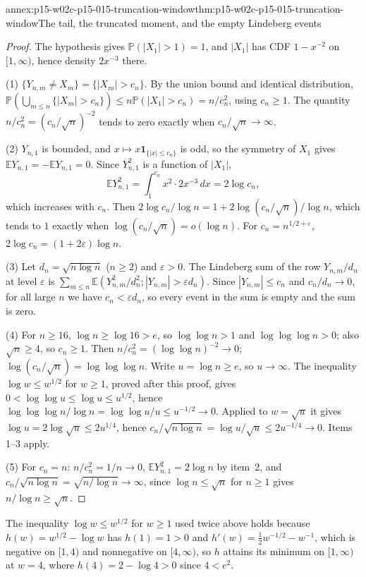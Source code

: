 \begin{annexitem}{annex:p15-w02c-p15-015-truncation-window}{thm:p15-w02c-p15-015-truncation-window}{The tail, the truncated moment, and the empty Lindeberg events}
\begin{proof}
The hypothesis gives \(\mathbb P(|X_1|>1)=1\), and \(|X_1|\) has CDF
\(1-x^{-2}\) on \([1,\infty)\), hence density \(2x^{-3}\) there.

(1) \(\{Y_{n,m}\ne X_m\}=\{|X_m|>c_n\}\). By the union bound and
identical distribution,
\(\mathbb P(\bigcup_{m\leq n}\{|X_m|>c_n\})\leq n\mathbb P(|X_1|>c_n)
=n/c_n^2\), using \(c_n\geq1\). The quantity \(n/c_n^2=(c_n/\sqrt n)^{-2}\)
tends to zero exactly when \(c_n/\sqrt n\to\infty\).

(2) \(Y_{n,1}\) is bounded, and \(x\mapsto x\mathbf1_{\{|x|\leq c_n\}}\)
is odd, so the symmetry of \(X_1\) gives
\(\mathbb EY_{n,1}=-\mathbb EY_{n,1}=0\). Since \(Y_{n,1}^2\) is a
function of \(|X_1|\),
\[
 \mathbb EY_{n,1}^2=\int_1^{c_n}x^2\cdot2x^{-3}\,dx=2\log c_n,
\]
which increases with \(c_n\). Then
\(2\log c_n/\log n=1+2\log(c_n/\sqrt n)/\log n\), which tends to \(1\)
exactly when \(\log(c_n/\sqrt n)=o(\log n)\). For
\(c_n=n^{1/2+\varepsilon}\), \(2\log c_n=(1+2\varepsilon)\log n\).

(3) Let \(d_n=\sqrt{n\log n}\) (\(n\geq2\)) and \(\varepsilon>0\). The
Lindeberg sum of the row \(Y_{n,m}/d_n\) at level \(\varepsilon\) is
\(\sum_{m\leq n}\mathbb E(Y_{n,m}^2/d_n^2;|Y_{n,m}|>\varepsilon d_n)\).
Since \(|Y_{n,m}|\leq c_n\) and \(c_n/d_n\to0\), for all large \(n\) we
have \(c_n<\varepsilon d_n\), so every event in the sum is empty and the
sum is zero.

(4) For \(n\geq16\), \(\log n\geq\log16>e\), so \(\log\log n>1\) and
\(\log\log\log n>0\); also \(\sqrt n\geq4\), so \(c_n\geq1\). Then
\(n/c_n^2=(\log\log n)^{-2}\to0\);
\(\log(c_n/\sqrt n)=\log\log\log n\). Write \(u=\log n\geq e\), so
\(u\to\infty\). The inequality \(\log w\leq w^{1/2}\) for \(w\geq1\),
proved after this proof, gives \(0<\log\log u\leq\log u\leq u^{1/2}\),
hence \(\log\log\log n/\log n=\log\log u/u\leq u^{-1/2}\to0\). Applied
to \(w=\sqrt u\) it gives \(\log u=2\log\sqrt u\leq2u^{1/4}\), hence
\(c_n/\sqrt{n\log n}=\log u/\sqrt u\leq2u^{-1/4}\to0\). Items 1--3
apply.

(5) For \(c_n=n\): \(n/c_n^2=1/n\to0\), \(\mathbb EY_{n,1}^2=2\log n\)
by item~2, and \(c_n/\sqrt{n\log n}=\sqrt{n/\log n}\to\infty\), since
\(\log n\leq\sqrt n\) for \(n\geq1\) gives
\(n/\log n\geq\sqrt n\).
\end{proof}
The inequality \(\log w\leq w^{1/2}\) for \(w\geq1\) used twice above
holds because \(h(w)=w^{1/2}-\log w\) has \(h(1)=1>0\) and
\(h'(w)=\frac12w^{-1/2}-w^{-1}\), which is negative on \([1,4)\) and
nonnegative on \([4,\infty)\), so \(h\) attains its minimum on
\([1,\infty)\) at \(w=4\), where \(h(4)=2-\log4>0\) since \(4<e^2\).
\end{annexitem}

